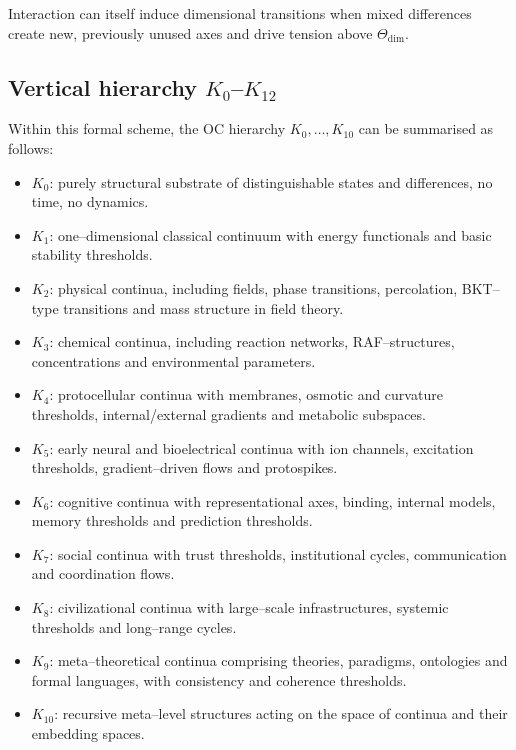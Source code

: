 Interaction can itself induce dimensional transitions when mixed differences create new, previously unused axes and drive tension above \(\Theta_{\mathrm{dim}}\).

\subsection{Vertical hierarchy \texorpdfstring{$K_0$–$K_{12}$}{K0–K12}}

Within this formal scheme, the OC hierarchy \(K_0,\dots,K_{10}\) can be summarised as follows:

\begin{itemize}
    \item \(K_0\): purely structural substrate of distinguishable states and differences, no time, no dynamics.
    \item \(K_1\): one–dimensional classical continuum with energy functionals and basic stability thresholds.
    \item \(K_2\): physical continua, including fields, phase transitions, percolation, BKT–type transitions and mass structure in field theory.
    \item \(K_3\): chemical continua, including reaction networks, RAF–structures, concentrations and environmental parameters.
    \item \(K_4\): protocellular continua with membranes, osmotic and curvature thresholds, internal/external gradients and metabolic subspaces.
    \item \(K_5\): early neural and bioelectrical continua with ion channels, excitation thresholds, gradient–driven flows and protospikes.
    \item \(K_6\): cognitive continua with representational axes, binding, internal models, memory thresholds and prediction thresholds.
    \item \(K_7\): social continua with trust thresholds, institutional cycles, communication and coordination flows.
    \item \(K_8\): civilizational continua with large–scale infrastructures, systemic thresholds and long–range cycles.
    \item \(K_9\): meta–theoretical continua comprising theories, paradigms, ontologies and formal languages, with consistency and coherence thresholds.
    \item \(K_{10}\): recursive meta–level structures acting on the space of continua and their embedding spaces.
\end{itemize}


